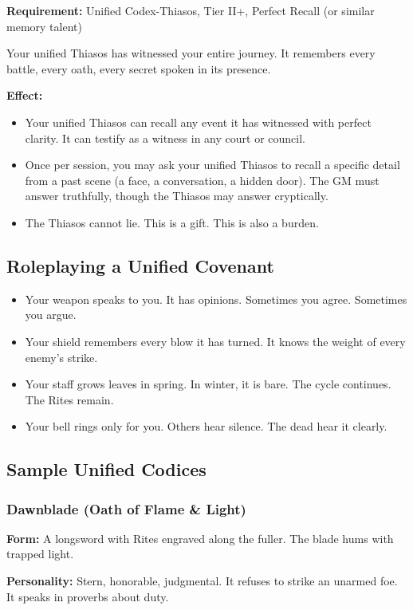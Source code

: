 \textbf{Requirement:} Unified Codex-Thiasos, Tier II+, Perfect Recall (or similar memory talent)

Your unified Thiasos has witnessed your entire journey. It remembers every battle, every oath, every secret spoken in its presence.

\textbf{Effect:}
\begin{itemize}
\item Your unified Thiasos can recall any event it has witnessed with perfect clarity. It can testify as a witness in any court or council.
\item Once per session, you may ask your unified Thiasos to recall a specific detail from a past scene (a face, a conversation, a hidden door). The GM must answer truthfully, though the Thiasos may answer cryptically.
\item The Thiasos cannot lie. This is a gift. This is also a burden.
\end{itemize}

\subsection{Roleplaying a Unified Covenant}

\begin{itemize}
\item Your weapon speaks to you. It has opinions. Sometimes you agree. Sometimes you argue.
\item Your shield remembers every blow it has turned. It knows the weight of every enemy's strike.
\item Your staff grows leaves in spring. In winter, it is bare. The cycle continues. The Rites remain.
\item Your bell rings only for you. Others hear silence. The dead hear it clearly.
\end{itemize}

\subsection{Sample Unified Codices}

\subsubsection{Dawnblade (Oath of Flame \& Light)}

\textbf{Form:} A longsword with Rites engraved along the fuller. The blade hums with trapped light.

\textbf{Personality:} Stern, honorable, judgmental. It refuses to strike an unarmed foe. It speaks in proverbs about duty.

